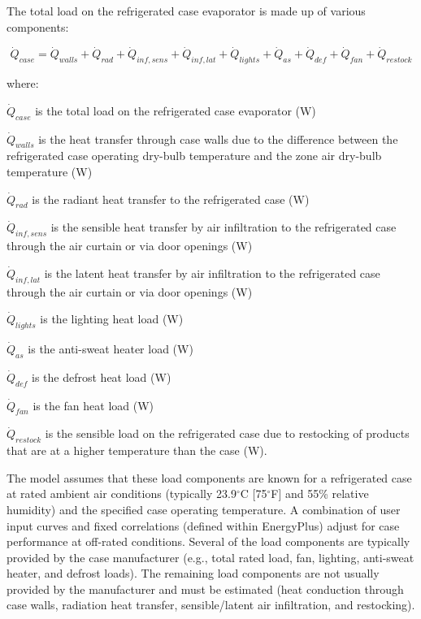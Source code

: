 The total load on the refrigerated case evaporator is made up of various components:

\begin{equation}
{\dot Q_{case}} = {\dot Q_{walls}} + {\dot Q_{rad}} + {\dot Q_{inf,sens}} + {\dot Q_{inf,lat}} + {\dot Q_{lights}} + {\dot Q_{as}} + {\dot Q_{def}} + {\dot Q_{fan}} + {\dot Q_{restock}}
\label{eq:TotalLoadRefCaseEvaporator}
\end{equation}

where:

\({\dot Q_{case}}\) is the total load on the refrigerated case evaporator (W)

\({\dot Q_{walls}}\) is the heat transfer through case walls due to the difference between the refrigerated case operating dry-bulb temperature and the zone air dry-bulb temperature (W)

\({\dot Q_{rad}}\) is the radiant heat transfer to the refrigerated case (W)

\({\dot Q_{inf,sens}}\) is the sensible heat transfer by air infiltration to the refrigerated case through the air curtain or via door openings (W)

\({\dot Q_{inf,lat}}\) is the latent heat transfer by air infiltration to the refrigerated case through the air curtain or via door openings (W)

\({\dot Q_{lights}}\) is the lighting heat load (W)

\({\dot Q_{as}}\) is the anti-sweat heater load (W)

\({\dot Q_{def}}\) is the defrost heat load (W)

\({\dot Q_{fan}}\) is the fan heat load (W)

\({\dot Q_{restock}}\) is the sensible load on the refrigerated case due to restocking of products that are at a higher temperature than the case (W).

The model assumes that these load components are known for a refrigerated case at rated ambient air conditions (typically 23.9\(^{\circ}\)C {[}75\(^{\circ}\)F{]} and 55\% relative humidity) and the specified case operating temperature. A combination of user input curves and fixed correlations (defined within EnergyPlus) adjust for case performance at off-rated conditions. Several of the load components are typically provided by the case manufacturer (e.g., total rated load, fan, lighting, anti-sweat heater, and defrost loads). The remaining load components are not usually provided by the manufacturer and must be estimated (heat conduction through case walls, radiation heat transfer, sensible/latent air infiltration, and restocking).


